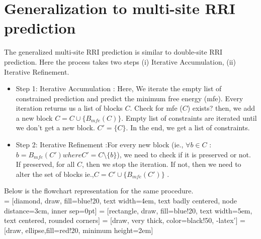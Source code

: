 \documentclass[twoside,a4paper]{report}
\numberwithin{equation}{section}
\begin{document}
	\section{Generalization to multi-site RRI prediction}
	
	The generalized multi-site RRI prediction is similar to double-site RRI prediction. Here the process takes two steps (i) Iterative Accumulation, (ii) Iterative Refinement.\\
	 \begin{itemize}
	
	\item Step 1: Iterative Accumulation : Here, We iterate the empty list of constrained prediction and predict the minimum free energy (mfe). Every iteration returns us a list of blocks $C$. Check for mfe ($C$) exists? then, we add a new block $C=C \cup \{B_{mfe}(C)\}$. Empty list of constraints are iterated until we don't get a new block. $C' = \{C\}$. In the end, we get a list of constraints.
	\item Step 2: Iterative Refinement :For every new block (ie., $\forall b \in C$ : $b= B_{mfe}(C') where $$C'=C\setminus\{b\}$), we need to check if it is preserved or not. If preserved, for all $C$, then we stop the iteration. If not, then we need to alter the set of blocks ie.,$C=C' \cup \{B_{mfe} (C')\}$ .
	
\end{itemize}

Below is the flowchart representation for the same procedure.\\

 = [diamond, draw, fill=blue!20, 
text width=4em, text badly centered, node distance=3cm, inner sep=0pt]
 = [rectangle, draw, fill=blue!20, 
text width=5em, text centered, rounded corners]
 = [draw, very thick, color=black!50, -latex']
 = [draw, ellipse,fill=red!20,
minimum height=2em]
\end{document}
